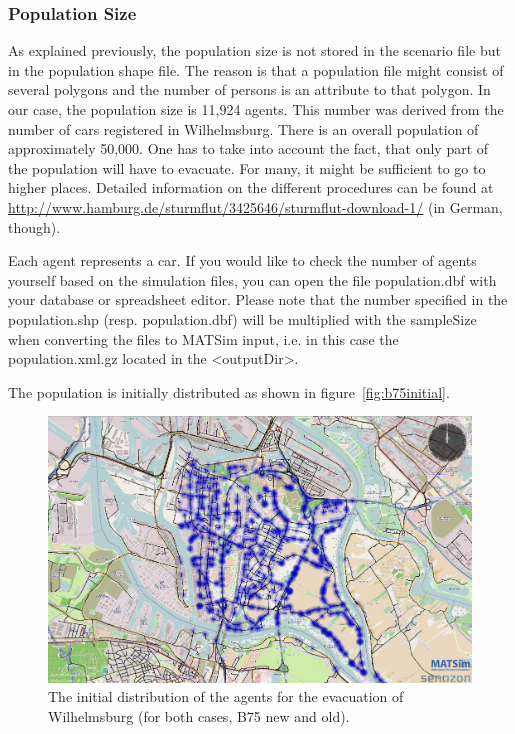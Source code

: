 \subsubsection{Population Size}
As explained previously, the population size is not stored in the scenario file but in the population shape file. The reason is that a population file might consist of several polygons and the number of persons is an attribute to that polygon. In our case, the population size is 11,924 agents. This number was derived from the number of cars registered in Wilhelmsburg. There is an overall population of approximately 50,000. One has to take into account the fact, that only part of the population will have to evacuate. For many, it might be sufficient to go to higher places. Detailed information on the different procedures can be found at \url{http://www.hamburg.de/sturmflut/3425646/sturmflut-download-1/} (in German, though).

Each agent represents a car. If you would like to check the number of agents yourself based on the simulation files, you can open the file population.dbf with your database or spreadsheet editor. Please note that the number specified in the population.shp (resp. population.dbf) will be multiplied with the sampleSize when converting the files to MATSim input, i.e. in this case the population.xml.gz located in the <outputDir>.

The population is initially distributed as shown in figure~\ref{fig:b75initial}. 

\begin{figure}[th!]
\centering
\includegraphics[width=0.7\linewidth]{extending/figures/Evacuation/B75initial}
\caption[Initial Distribution of Agents.]{The initial distribution of the agents for the evacuation of Wilhelmsburg (for both cases, B75 new and old).}
\label{fig:B75initial}
\end{figure}


